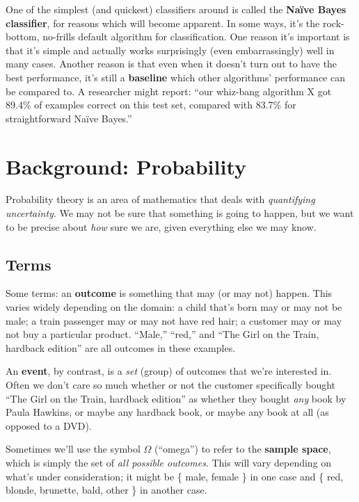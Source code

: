 One of the simplest (and quickest) classifiers around is called the
\textbf{Na\"{i}ve Bayes classifier}, for reasons which will become apparent. In
some ways, it's the rock-bottom, no-frills default algorithm for
classification. One reason it's important is that it's simple and actually
works surprisingly (even embarrassingly) well in many cases. Another reason is
that even when it doesn't turn out to have the best performance,
it's still a \textbf{baseline} which other algorithms' performance can be
compared to. A researcher might report: ``our whiz-bang algorithm X got 89.4\%
of examples correct on this test set, compared with 83.7\% for straightforward
Na\"{i}ve Bayes.''

\section{Background: Probability}

Probability theory is an area of mathematics that deals with
\textit{quantifying uncertainty}. We may not be sure that something is going
to happen, but we want to be precise about \textit{how} sure we are, given
everything else we may know.

\subsection{Terms}

Some terms: an \textbf{outcome} is something that may (or may not) happen.
This varies widely depending on the domain: a child that's born may or may not
be male; a train passenger may or may not have red hair; a customer may or may
not buy a particular product. ``Male,'' ``red,'' and ``The Girl on the Train,
hardback edition'' are all outcomes in these examples.

An \textbf{event}, by contrast, is a \textit{set} (group) of outcomes that
we're interested in. Often we don't care so much whether or not the customer
specifically bought ``The Girl on the Train, hardback edition'' as whether they
bought \textit{any} book by Paula Hawkins, or maybe any hardback book, or
maybe any book at all (as opposed to a DVD).

Sometimes we'll use the symbol $\Omega$ (``omega'') to refer to the
\textbf{sample space}, which is simply the set of \textit{all possible
outcomes}. This will vary depending on what's under consideration; it might be
\{ male, female \} in one case and \{ red, blonde, brunette, bald, other \} in
another case.

